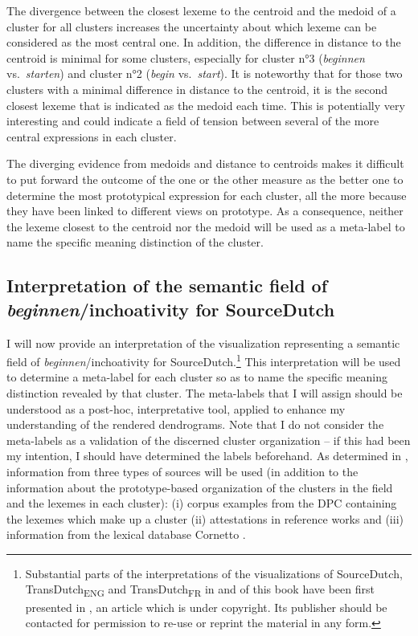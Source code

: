 The divergence between the closest lexeme to the centroid and the medoid of a cluster for all clusters increases the uncertainty about which lexeme can be considered as the most central one. In addition, the difference in distance to the centroid is minimal for some clusters, especially for cluster n°3 (\textit{beginnen} vs.\ \textit{starten}) and cluster n°2 (\textit{begin} vs.\ \textit{start}). It is noteworthy that for those two clusters with a minimal difference in distance to the centroid, it is the second closest lexeme that is indicated as the medoid each time. This is potentially very interesting and could indicate a field of tension between several of the more central expressions in each cluster.

The diverging evidence from medoids and distance to centroids makes it difficult to put forward the outcome of the one or the other measure as the better one to determine the most prototypical expression for each cluster, all the more because they have been linked to different views on prototype. As a consequence, neither the lexeme closest to the centroid nor the medoid will be used as a meta-label to name the specific meaning distinction of the cluster.

\subsection{Interpretation of the semantic field of \textit{beginnen}\slash inchoativity for SourceDutch}
\label{sec:4.2.4}  
I will now provide an interpretation of the visualization representing a semantic field of \textit{beginnen}/inchoativity for SourceDutch.\footnote{Substantial parts of the interpretations of the visualizations of SourceDutch, TransDutch\textsubscript{ENG} and TransDutch\textsubscript{FR} in   and  of this book have been first presented in \citep{VandevoordeEtAl2017}, an article which is under copyright. Its publisher should be contacted for permission to re-use or reprint the material in any form.} This interpretation will be used to determine a meta-label for each cluster so as to name the specific meaning distinction revealed by that cluster. The meta-labels that I will assign should be understood as a post-hoc, interpretative tool, applied to enhance my understanding of the rendered dendrograms. Note that I do not consider the meta-labels as a validation of the discerned cluster organization – if this had been my intention, I should have determined the labels beforehand. As determined in , information from three types of sources will be used (in addition to the information about the prototype-based organization of the clusters in the field and the lexemes in each cluster): (i) corpus examples from the DPC containing the lexemes which make up a cluster (ii) attestations in reference works and (iii) information from the lexical database Cornetto \citep{vossen_cornetto_2008, spyns_cornetto:_2013}. 

